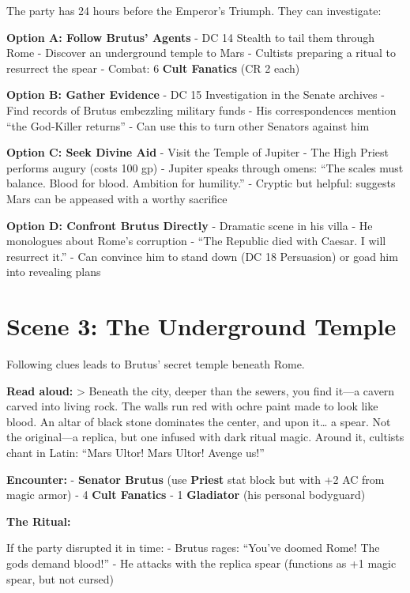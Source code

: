 \documentclass[
]{book}
\begin{document}
The party has 24 hours before the Emperor's Triumph. They can
investigate:

\textbf{Option A: Follow Brutus' Agents} - DC 14 Stealth to tail them
through Rome - Discover an underground temple to Mars - Cultists
preparing a ritual to resurrect the spear - Combat: 6 \textbf{Cult
Fanatics} (CR 2 each)

\textbf{Option B: Gather Evidence} - DC 15 Investigation in the Senate
archives - Find records of Brutus embezzling military funds - His
correspondences mention ``the God-Killer returns'' - Can use this to
turn other Senators against him

\textbf{Option C: Seek Divine Aid} - Visit the Temple of Jupiter - The
High Priest performs augury (costs 100 gp) - Jupiter speaks through
omens: ``The scales must balance. Blood for blood. Ambition for
humility.'' - Cryptic but helpful: suggests Mars can be appeased with a
worthy sacrifice

\textbf{Option D: Confront Brutus Directly} - Dramatic scene in his
villa - He monologues about Rome's corruption - ``The Republic died with
Caesar. I will resurrect it.'' - Can convince him to stand down (DC 18
Persuasion) or goad him into revealing plans

\section{Scene 3: The Underground
Temple}\label{scene-3-the-underground-temple}

Following clues leads to Brutus' secret temple beneath Rome.

\textbf{Read aloud:} \textgreater{} Beneath the city, deeper than the
sewers, you find it---a cavern carved into living rock. The walls run
red with ochre paint made to look like blood. An altar of black stone
dominates the center, and upon it\ldots{} a spear. Not the original---a
replica, but one infused with dark ritual magic. Around it, cultists
chant in Latin: ``Mars Ultor! Mars Ultor! Avenge us!''

\textbf{Encounter:} - \textbf{Senator Brutus} (use \textbf{Priest} stat
block but with +2 AC from magic armor) - 4 \textbf{Cult Fanatics} - 1
\textbf{Gladiator} (his personal bodyguard)

\textbf{The Ritual:}

If the party disrupted it in time: - Brutus rages: ``You've doomed Rome!
The gods demand blood!'' - He attacks with the replica spear (functions
as +1 magic spear, but not cursed)
\end{document}
